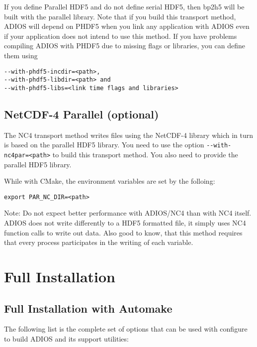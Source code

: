 If you define Parallel HDF5 and do not define serial HDF5, then bp2h5 will be built
with the parallel library.
Note that if you build this transport method, ADIOS will depend on PHDF5 when you
link any application with ADIOS even if your application does not intend to
use this method.
If you have problems compiling ADIOS with PHDF5 due to missing flags or libraries,
you can define them using

\begin{lstlisting}
--with-phdf5-incdir=<path>,
--with-phdf5-libdir=<path> and
--with-phdf5-libs=<link time flags and libraries>
\end{lstlisting}

\subsection{NetCDF-4 Parallel (optional)}

The NC4 transport method writes files using the NetCDF-4 library which in turn
is based on the parallel HDF5 library. You need to use the option
\verb+--with-nc4par=<path>+ to build this transport method.
You also need to provide the parallel HDF5 library.

While with CMake, the environment variables are set by the folloing:
\begin{lstlisting}
export PAR_NC_DIR=<path>
\end{lstlisting}

\noindent Note: Do not expect better performance with ADIOS/NC4 than with NC4 itself. ADIOS does not write differently to a HDF5 formatted file, it simply uses NC4 function calls to write out data. Also good to know, that this method requires that every process participates in the writing of each variable.

\section{Full Installation}

\subsection{Full Installation with Automake}

The following list is the complete set of options that can be used with
configure to build ADIOS and its support utilities:

